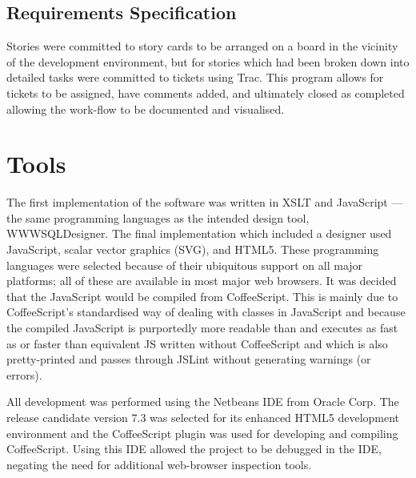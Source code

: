 \subsection*{Requirements Specification}
Stories were committed to story cards to be arranged on a board in the vicinity of the development environment, but for stories which had been broken down into detailed tasks were committed to tickets using Trac. This program allows for tickets to be assigned, have comments added, and ultimately closed as completed allowing the work-flow to be documented and visualised.

\section{Tools}
The first implementation of the software was written in XSLT and JavaScript --- the same programming languages as the intended design tool, \mbox{WWWSQLDesigner}. The final implementation which included a designer used JavaScript, scalar vector graphics (SVG), and HTML5. These programming languages were selected because of their ubiquitous support on all major platforms; all of these are available in most major web browsers. It was decided that the Java\-Script would be compiled from Coffee\-Script. This is mainly due to Coffee\-Script's standardised way of dealing with classes in Java\-Script and because the compiled Java\-Script is purportedly more readable than and executes as fast as or faster than equivalent JS written without Coffee\-Script and which is also pretty-printed and passes through JSLint without generating warnings (or errors).

All development was performed using the Netbeans IDE from Oracle Corp. The release candidate version 7.3 was selected for its enhanced HTML5 development environment and the Coffee\-Script plugin was used for developing and compiling Coffee\-Script. Using this IDE allowed the project to be debugged in the IDE, negating the need for additional web-browser inspection tools.